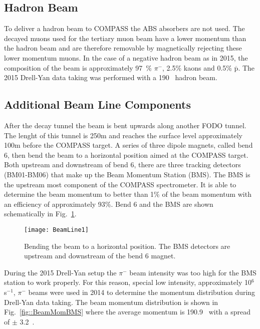 \subsection{Hadron Beam}
To deliver a hadron beam to COMPASS the ABS absorbers are not used.  The decayed
muons used for the tertiary muon beam have a lower momentum than the hadron beam
and are therefore removable by magnetically rejecting these lower momentum
muons.  In the case of a negative hadron beam as in 2015, the composition of the
beam is approximately 97~\% $\pi^-$, 2.5\% kaons and 0.5\%
$\overline{\mathrm{p}}$. The 2015 Drell-Yan data taking was performed with a
190~{\gvc} hadron beam. \par

\subsection{Additional Beam Line Components} \label{sec::addBeam}
After the decay tunnel the beam is bent upwards along another FODO tunnel.  The
lenght of this tunnel is 250m and reaches the surface level approximately 100m
before the COMPASS target.  A series of three dipole magnets, called bend 6,
then bend the beam to a horizontal position aimed at the COMPASS target.  Both
upstream and downstream of bend 6, there are three tracking detectors
(BM01-BM06) that make up the Beam Momentum Station (BMS).  The BMS is the
upstream most component of the COMPASS spectrometer.  It is able to determine
the beam momentum to better than 1\% of the beam momentum with an efficiency of
approximately 93\%.  Bend 6 and the BMS are shown schematically in
Fig.~\ref{fig::BeamLine1}. \par

\begin{figure}[h!t]
  \centering
  \texttt{[image: BeamLine1]}
  \caption{Bending the beam to a horizontal position.  The BMS detectors are
    upstream and downstream of the bend 6 magnet.}
  \label{fig::BeamLine1}
\end{figure}

During the 2015 Drell-Yan setup the $\pi^-$ beam intensity was too high for the
BMS station to work properly.  For this reason, special low intensity,
approximately 10$^6$ s$^{-1}$, $\pi^-$ beams were used in 2014 to determine the
momentum distribution during Drell-Yan data taking.  The beam momentum
distribution is shown in Fig.~\ref{fig::BeamMomBMS} where the average momentum
is 190.9~{\gvc} with a spread of $\pm$ 3.2~{\gvc}. \par


